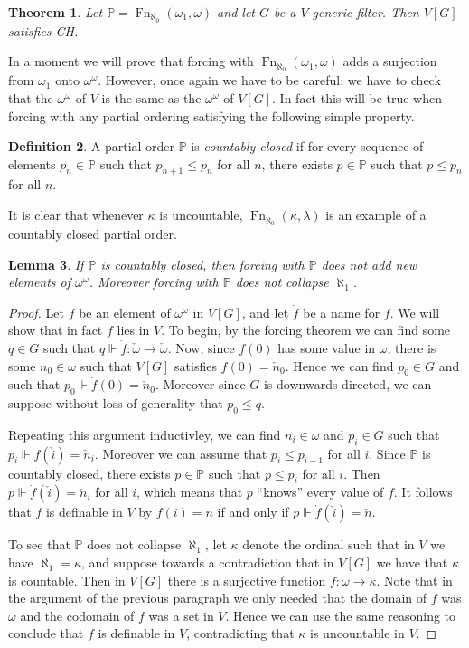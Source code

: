 \documentclass[11pt,oneside]{amsbook}
\newcommand{\PP}{\mathbb P}
\newcommand{\forces}{\Vdash}
\DeclareMathOperator{\Fn}{Fn}
\theoremstyle{definition}
\theoremstyle{plain}
\newtheorem{thm}{Theorem}[section]
\newtheorem{lem}[thm]{Lemma}
\theoremstyle{definition}
\newtheorem{defn}[thm]{Definition}
\theoremstyle{remark}
\begin{document}
\begin{thm}
  \label{thm:force-ch}
  Let $\PP=\Fn_{\aleph_0}(\omega_1,\omega)$ and let $G$ be a $V$-generic filter. Then $V[G]$ satisfies CH.
\end{thm}

In a moment we will prove that forcing with $\Fn_{\aleph_0}(\omega_1,\omega)$ adds a surjection from $\omega_1$ onto $\omega^\omega$. However, once again we have to be careful: we have to check that the $\omega^\omega$ of $V$ is the same as the $\omega^\omega$ of $V[G]$. In fact this will be true when forcing with any partial ordering satisfying the following simple property.

\begin{defn}
  A partial order $\PP$ is \emph{countably closed} if for every sequence of elements $p_n\in\PP$ such that $p_{n+1}\leq p_n$ for all $n$, there exists $p\in\PP$ such that $p\leq p_n$ for all $n$.
\end{defn}

It is clear that whenever $\kappa$ is uncountable, $\Fn_{\aleph_0}(\kappa,\lambda)$ is an example of a countably closed partial order.

\begin{lem}
  \label{lem:forcing-closed-preserves}
  If $\PP$ is countably closed, then forcing with $\PP$ does not add new elements of $\omega^\omega$. Moreover forcing with $\PP$ does not collapse $\aleph_1$.
\end{lem}

\begin{proof}
  Let $f$ be an element of $\omega^\omega$ in $V[G]$, and let $\dot f$ be a name for $f$. We will show that in fact $f$ lies in $V$. To begin, by the forcing theorem we can find some $q\in G$ such that $q\forces \dot f\colon\check\omega\to\check\omega$. Now, since $f(0)$ has some value in $\omega$, there is some $n_0\in\omega$ such that $V[G]$ satisfies $f(0)=\check n_0$. Hence we can find $p_0\in G$ and such that $p_0\forces\dot f(0)=\check n_0$. Moreover since $G$ is downwards directed, we can suppose without loss of generality that $p_0\leq q$.

  Repeating this argument inductivley, we can find $n_i\in\omega$ and $p_i\in G$ such that $p_i\forces f(\check i)=\check n_i$. Moreover we can assume that $p_i\leq p_{i-1}$ for all $i$. Since $\PP$ is countably closed, there exists $p\in\PP$ such that $p\leq p_i$ for all $i$. Then $p\forces\dot f(\check i)=\check n_i$ for all $i$, which means that $p$ ``knows'' every value of $f$. It follows that $f$ is definable in $V$ by $f(i)=n$ if and only if $p\forces\dot f(\check i)=\check n$.

  To see that $\PP$ does not collapse $\aleph_1$, let $\kappa$ denote the ordinal such that in $V$ we have $\aleph_1=\kappa$, and suppose towards a contradiction that in $V[G]$ we have that $\kappa$ is countable. Then in $V[G]$ there is a surjective function $f\colon\omega\to\kappa$. Note that in the argument of the previous paragraph we only needed that the domain of $f$ was $\omega$ and the codomain of $f$ was a set in $V$. Hence we can use the same reasoning to conclude that $f$ is definable in $V$, contradicting that $\kappa$ is uncountable in $V$.
\end{proof}
\end{document}
